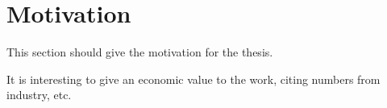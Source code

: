 \section{Motivation}

This section should give the motivation for the thesis.

It is interesting to give an economic value to the work, citing numbers from industry, etc.